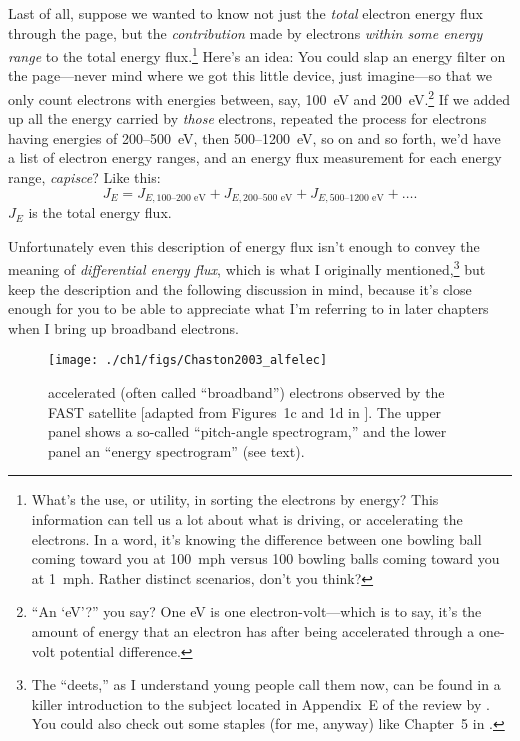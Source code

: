 Last of all, suppose we wanted to know not just the \emph{total} electron energy
flux through the page, but the \emph{contribution} made by electrons
\emph{within some energy range} to the total energy flux.\footnote{What's the
  use, or utility, in sorting the electrons by energy? This information can tell
  us a lot about what is driving, or accelerating the electrons. In a word, it's
  knowing the difference between one bowling ball coming toward you at 100~mph
  versus 100 bowling balls coming toward you at 1~mph. Rather distinct
  scenarios, don't you think?} Here's an idea: You could slap an energy filter
on the page---never mind where we got this little device, just imagine---so that
we only count electrons with energies between, say, 100~eV and
200~eV.\footnote{``An `eV'?''  you say? One eV is one electron-volt---which is
  to say, it's the amount of energy that an electron has after being accelerated
  through a one-volt potential difference.} If we added up all the energy
carried by \emph{those} electrons, repeated the process for electrons having
energies of 200--500~eV, then 500--1200~eV, so on and so forth, we'd have a list
of electron energy ranges, and an energy flux measurement for each energy range,
\emph{capisce}? Like this:
\begin{equation}
  \label{ch1:eqeFlux}
  J_{E} = J_{E,\textrm{100--200 eV}} + J_{E,\textrm{200--500 eV}} + J_{E,\textrm{500--1200 eV}} + \dots .
\end{equation}
$J_E$ is the total energy flux.

Unfortunately even this description of energy flux isn't enough to
convey the meaning of \emph{differential energy flux}, which is what I
originally mentioned,\footnote{The ``deets,'' as I understand young
  people call them now, can be found in a killer introduction to the
  subject located in Appendix~E of the review by
  \citet{Bruno2013}. You could also check out some staples (for me,
  anyway) like Chapter~5 in \citet{Paschmann1998}.} but keep the
description and the following discussion in mind, because it's close
enough for you to be able to appreciate what I'm referring to in later
chapters when I bring up broadband electrons.


\begin{figure}
  \centering
  \noindent\texttt{[image: ./ch1/figs/Chaston2003\_alfelec]}
  \caption[\Alfically accelerated (broadband) electrons]{\Alfically
    accelerated (often called ``broadband'') electrons observed by
    the FAST satellite [adapted from Figures~1c and 1d in
    \citealp{Chaston2003a}]. The upper panel shows a so-called
    ``pitch-angle spectrogram,'' and the lower panel an ``energy
    spectrogram'' (see text).}
  \label{ch1:FigAlfElec}
\end{figure}

